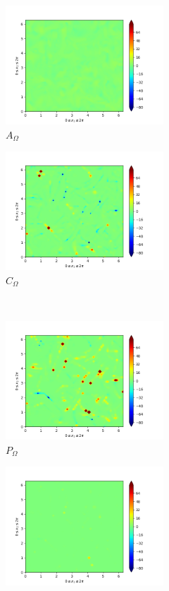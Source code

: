 \begin{figure}[H]
\begin{subfigure}{0.45\textwidth}
        \includegraphics[height=1.75in]{media/run-cds-65/A-enst-1330.png}
        \caption{$A_{\Omega}$}
    \end{subfigure}
    \newline
    \begin{subfigure}{0.45\textwidth}
        \includegraphics[height=1.75in]{media/run-cds-65/Pi-enst-1330.png}
        \caption{$C_{\Omega}$}
    \end{subfigure}
    ~
    \begin{subfigure}{0.45\textwidth}
        \includegraphics[height=1.75in]{media/run-cds-65/P-enst-1330.png}
        \caption{$P_{\Omega}$}
    \end{subfigure}
    \newline
    \begin{subfigure}{0.45\textwidth}
        \includegraphics[height=1.75in]{media/run-cds-65/B-enst-1330.png}

\end{subfigure}
\end{figure}
